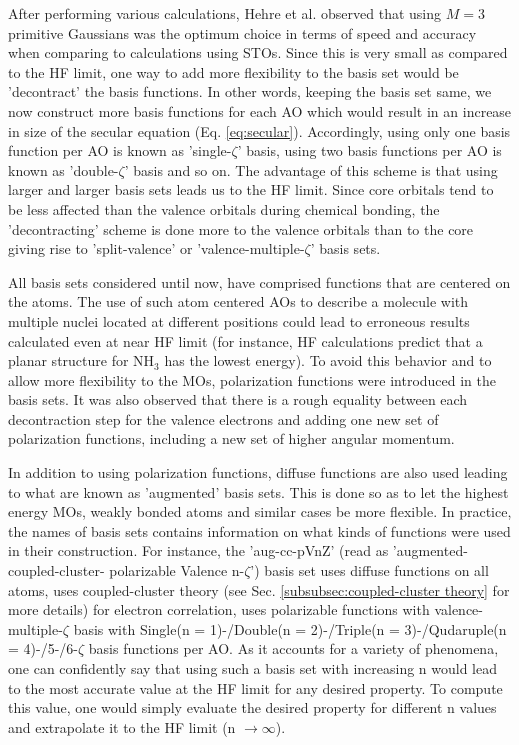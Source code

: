             After performing various calculations, Hehre et al. \cite{Hehre1969} observed that using $M = 3$ primitive Gaussians was the optimum choice in terms of speed and accuracy when comparing to calculations using STOs. Since this is very small as compared to the HF limit, one way to add more flexibility to the basis set would be 'decontract' the basis functions. In other words, keeping the basis set same, we now construct more basis functions for each AO which would result in an increase in size of the secular equation (Eq. \eqref{eq:secular}). Accordingly, using only one basis function per AO is known as 'single-$\zeta$' basis, using two basis functions per AO is known as 'double-$\zeta$' basis and so on. The advantage of this scheme is that using larger and larger basis sets leads us to the HF limit. Since core orbitals tend to be less affected than the valence orbitals during chemical bonding, the 'decontracting' scheme is done more to the valence orbitals than to the core giving rise to 'split-valence' or 'valence-multiple-$\zeta$' basis sets.

            All basis sets considered until now, have comprised functions that are centered on the atoms. The use of such atom centered AOs to describe a molecule with multiple nuclei located at different positions could lead to erroneous results calculated even at near HF limit (for instance, HF calculations predict that a planar structure for NH$_3$ has the lowest energy). To avoid this behavior and to allow more flexibility to the MOs, polarization functions were introduced in the basis sets. It was also observed that there is a rough equality between each decontraction step for the valence electrons and adding one new set of polarization functions, including a new set of higher angular momentum.

            In addition to using polarization functions, diffuse functions are also used leading to what are known as 'augmented' basis sets. This is done so as to let the highest energy MOs, weakly bonded atoms and similar cases be more flexible. In practice, the names of basis sets contains information on what kinds of functions were used in their construction. For instance, the 'aug-cc-pVnZ' (read as 'augmented-coupled-cluster- polarizable Valence n-$\zeta$') basis set uses diffuse functions on all atoms, uses coupled-cluster theory (see Sec. \ref{subsubsec:coupled-cluster theory} for more details) for electron correlation, uses polarizable functions with valence-multiple-$\zeta$ basis with Single(n = 1)-/Double(n = 2)-/Triple(n = 3)-/Qudaruple(n = 4)-/5-/6-$\zeta$ basis functions per AO. As it accounts for a variety of phenomena, one can confidently say that using such a basis set with increasing n would lead to the most accurate value at the HF limit for any desired property. To compute this value, one would simply evaluate the desired property for different n values and extrapolate it to the HF limit (n $\to \infty$).

